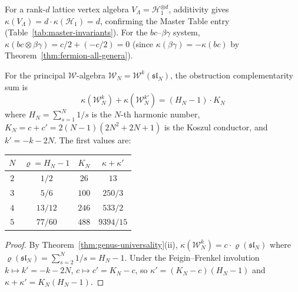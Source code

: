 \begin{example}
For a rank-$d$ lattice vertex algebra $V_\Lambda = \mathcal{H}_1^{\otimes d}$, additivity gives $\kappa(V_\Lambda) = d \cdot \kappa(\mathcal{H}_1) = d$, confirming the Master Table entry (Table~\ref{tab:master-invariants}). For the $bc$--$\beta\gamma$ system, $\kappa(bc \otimes \beta\gamma) = c/2 + (-c/2) = 0$ (since $\kappa(\beta\gamma) = -\kappa(bc)$ by Theorem~\ref{thm:fermion-all-genera}).
\end{example}

\begin{corollary}
\label{cor:kappa-sum-wn}
For the principal $\mathcal{W}$-algebra $\mathcal{W}_N = \mathcal{W}^k(\mathfrak{sl}_N)$, the obstruction complementarity sum is
\begin{equation}\label{eq:kappa-sum-wn}
\kappa(\mathcal{W}_N^k) + \kappa(\mathcal{W}_N^{k'}) = (H_N - 1) \cdot K_N
\end{equation}
where $H_N = \sum_{s=1}^N 1/s$ is the $N$-th harmonic number, $K_N = c + c' = 2(N-1)(2N^2+2N+1)$ is the Koszul conductor, and $k' = -k-2N$. The first values are:
\begin{center}
\begin{tabular}{cccc}
$N$ & $\varrho = H_N - 1$ & $K_N$ & $\kappa + \kappa'$ \\
\hline
$2$ & $1/2$ & $26$ & $13$ \\
$3$ & $5/6$ & $100$ & $250/3$ \\
$4$ & $13/12$ & $246$ & $533/2$ \\
$5$ & $77/60$ & $488$ & $9394/15$
\end{tabular}
\end{center}
\end{corollary}

\begin{proof}
By Theorem~\ref{thm:genus-universality}(ii), $\kappa(\mathcal{W}_N^k) = c \cdot \varrho(\mathfrak{sl}_N)$ where $\varrho(\mathfrak{sl}_N) = \sum_{s=2}^N 1/s = H_N - 1$. Under the Feigin--Frenkel involution $k \mapsto k' = -k - 2N$, $c \mapsto c' = K_N - c$, so $\kappa' = (K_N - c)(H_N - 1)$ and $\kappa + \kappa' = K_N(H_N - 1)$.
\end{proof}

